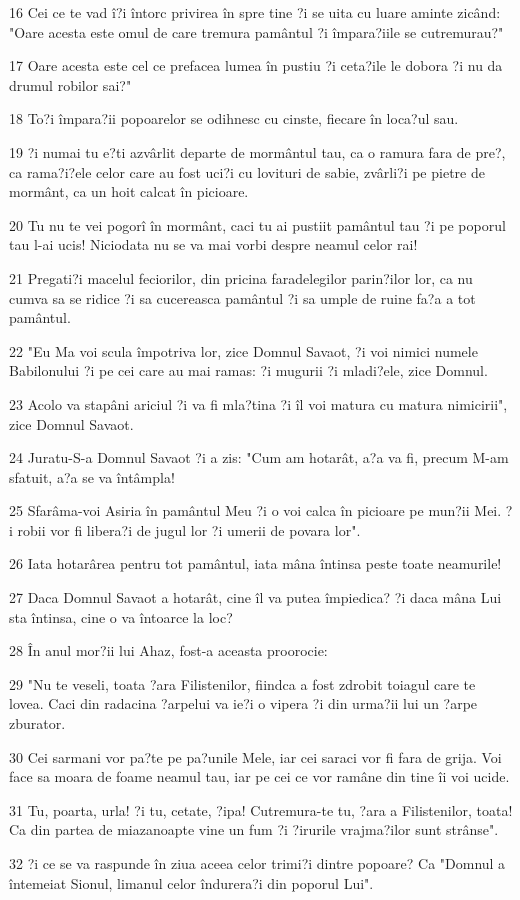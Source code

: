 \par 16 Cei ce te vad î?i întorc privirea în spre tine ?i se uita cu luare aminte zicând: "Oare acesta este omul de care tremura pamântul ?i împara?iile se cutremurau?"
\par 17 Oare acesta este cel ce prefacea lumea în pustiu ?i ceta?ile le dobora ?i nu da drumul robilor sai?"
\par 18 To?i împara?ii popoarelor se odihnesc cu cinste, fiecare în loca?ul sau.
\par 19 ?i numai tu e?ti azvârlit departe de mormântul tau, ca o ramura fara de pre?, ca rama?i?ele celor care au fost uci?i cu lovituri de sabie, zvârli?i pe pietre de mormânt, ca un hoit calcat în picioare.
\par 20 Tu nu te vei pogorî în mormânt, caci tu ai pustiit pamântul tau ?i pe poporul tau l-ai ucis! Niciodata nu se va mai vorbi despre neamul celor rai!
\par 21 Pregati?i macelul feciorilor, din pricina faradelegilor parin?ilor lor, ca nu cumva sa se ridice ?i sa cucereasca pamântul ?i sa umple de ruine fa?a a tot pamântul.
\par 22 "Eu Ma voi scula împotriva lor, zice Domnul Savaot, ?i voi nimici numele Babilonului ?i pe cei care au mai ramas: ?i mugurii ?i mladi?ele, zice Domnul.
\par 23 Acolo va stapâni ariciul ?i va fi mla?tina ?i îl voi matura cu matura nimicirii", zice Domnul Savaot.
\par 24 Juratu-S-a Domnul Savaot ?i a zis: "Cum am hotarât, a?a va fi, precum M-am sfatuit, a?a se va întâmpla!
\par 25 Sfarâma-voi Asiria în pamântul Meu ?i o voi calca în picioare pe mun?ii Mei. ?i robii vor fi libera?i de jugul lor ?i umerii de povara lor".
\par 26 Iata hotarârea pentru tot pamântul, iata mâna întinsa peste toate neamurile!
\par 27 Daca Domnul Savaot a hotarât, cine îl va putea împiedica? ?i daca mâna Lui sta întinsa, cine o va întoarce la loc?
\par 28 În anul mor?ii lui Ahaz, fost-a aceasta proorocie:
\par 29 "Nu te veseli, toata ?ara Filistenilor, fiindca a fost zdrobit toiagul care te lovea. Caci din radacina ?arpelui va ie?i o vipera ?i din urma?ii lui un ?arpe zburator.
\par 30 Cei sarmani vor pa?te pe pa?unile Mele, iar cei saraci vor fi fara de grija. Voi face sa moara de foame neamul tau, iar pe cei ce vor ramâne din tine îi voi ucide.
\par 31 Tu, poarta, urla! ?i tu, cetate, ?ipa! Cutremura-te tu, ?ara a Filistenilor, toata! Ca din partea de miazanoapte vine un fum ?i ?irurile vrajma?ilor sunt strânse".
\par 32 ?i ce se va raspunde în ziua aceea celor trimi?i dintre popoare? Ca "Domnul a întemeiat Sionul, limanul celor îndurera?i din poporul Lui".

